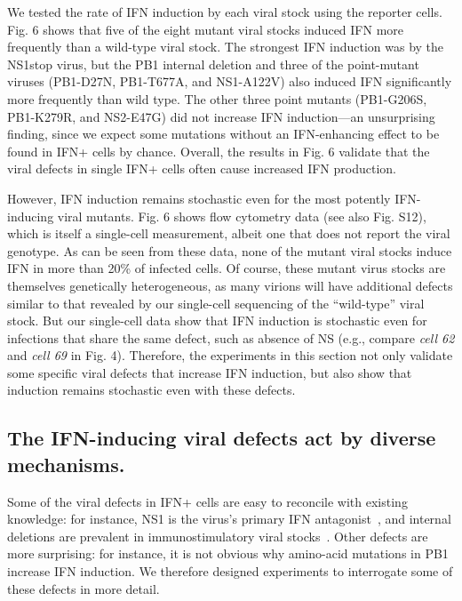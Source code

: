 \documentclass[]{article}
\begin{document}
We tested the rate of IFN induction by each viral stock using the reporter cells.
Fig. 6 shows that five of the eight mutant viral stocks induced IFN more frequently than a wild-type viral stock.
The strongest IFN induction was by the NS1stop virus, but the PB1 internal deletion and three of the point-mutant viruses (PB1-D27N, PB1-T677A, and NS1-A122V) also induced IFN significantly more frequently than wild type.
The other three point mutants (PB1-G206S, PB1-K279R, and NS2-E47G) did not increase IFN induction---an unsurprising finding, since we expect some mutations without an IFN-enhancing effect to be found in IFN+ cells by chance.
Overall, the results in Fig. 6 validate that the viral defects in single IFN+ cells often cause increased IFN production.

However, IFN induction remains stochastic even for the most potently IFN-inducing viral mutants.
Fig. 6 shows flow cytometry data (see also Fig. S12), which is itself a single-cell measurement, albeit one that does not report the viral genotype.
As can be seen from these data, none of the mutant viral stocks induce IFN in more than 20\% of infected cells. 
Of course, these mutant virus stocks are themselves genetically heterogeneous, as many virions will have additional defects similar to that revealed by our single-cell sequencing of the ``wild-type'' viral stock.
But our single-cell data show that IFN induction is stochastic even for infections that share the same defect, such as absence of NS (e.g., compare \textit{cell 62} and \textit{cell 69} in Fig. 4).
Therefore, the experiments in this section not only validate some specific viral defects that increase IFN induction, but also show that induction remains stochastic even with these defects.

\subsection*{The IFN-inducing viral defects act by diverse mechanisms.}
Some of the viral defects in IFN+ cells are easy to reconcile with existing knowledge: for instance, NS1 is the virus's primary IFN antagonist~\cite{garcia1998influenza, hale2008multifunctional}, and internal deletions are prevalent in immunostimulatory viral stocks~\cite{wang2018cell, baum2010preference, tapia2013defective, boergeling2015evidence, dimmock2015cloned, liu2019inhibition}.
Other defects are more surprising: for instance, it is not obvious why amino-acid mutations in PB1 increase IFN induction.
We therefore designed experiments to interrogate some of these defects in more detail.
\end{document}
